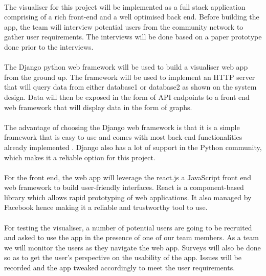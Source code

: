 \paragraph{}
The visualiser for this project will be implemented as a full stack application comprising of a rich front-end and a well optimised back end. Before building the app, the team will interview potential users from the community network to gather user requirements. The interviews will be done based on a paper prototype done prior to the interviews.
\paragraph{}
The  Django python web framework will be used to build a visualiser web app from the ground up. The framework will be used to implement an HTTP server that will query data from either database1 or database2 as shown on the system design. Data will then be exposed in the form of API endpoints to a front end web framework that will display data in the form of graphs.
\paragraph{}
The advantage of choosing the Django web framework is that it is a simple framework that is easy to use and comes with most back-end functionalities already implemented \cite{10.1007/978-3-540-87403-4_11}. Django also has a lot of support in the Python community, which makes it a reliable option for this project.
\paragraph{}
For the front end, the web app will leverage the react.js a JavaScript front end web framework to build user-friendly interfaces. React is a component-based library which allows rapid prototyping of web applications\cite{Gackenheimer2015}. It also managed by Facebook hence making it a reliable and trustworthy tool to use.
\paragraph{}
For testing the visualiser, a number of potential users are going to be recruited and asked to use the app in the presence of one of our team members. As a team we will monitor the users as they navigate the web app. Surveys will also be done so as to get the user's perspective on the usability of the app. Issues will be recorded and the app tweaked accordingly to meet the user requirements.
